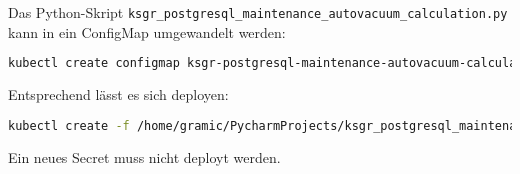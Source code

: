 \begin{flushleft}
    Das Python-Skript \texttt{ksgr\_postgresql\_maintenance\_autovacuum\_calculation.py} kann in ein ConfigMap umgewandelt werden:
    \lstset{style=gra_codestyle}
    \begin{lstlisting}[language=bash, caption=Maintenance-Tool - \Gls{AUTOVACUUM} - Python > ConfigMap,captionpos=b,label={lst:maintenannce-tool-autovacuum-python-to-configmap},breaklines=true]
kubectl create configmap ksgr-postgresql-maintenance-autovacuum-calculation --from-file /home/gramic/PycharmProjects/ksgr_postgresql_maintenance/ksgr_postgresql_maintenance_autovacuum_calculation.py --dry-run=client -o yaml > /home/gramic/PycharmProjects/ksgr_postgresql_maintenance/ksgr_postgresql_maintenance_autovacuum_calculation.yml -n ksgr-postgresql-maintenance
    \end{lstlisting}
    Entsprechend lässt es sich deployen:
    \lstset{style=gra_codestyle}
    \begin{lstlisting}[language=bash, caption=Maintenance-Tool - Bloated Tables / Indices - Python - ConfigMap Deploy,captionpos=b,label={lst:maintenannce-tool-autovacuum-python-configmap-deploy},breaklines=true]
kubectl create -f /home/gramic/PycharmProjects/ksgr_postgresql_maintenance/ksgr_postgresql_maintenance_autovacuum_calculation.yml -n ksgr-postgresql-maintenance
    \end{lstlisting}
\end{flushleft}
\begin{flushleft}
    Ein neues Secret muss nicht deployt werden.
\end{flushleft}
